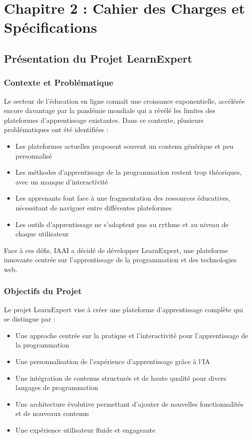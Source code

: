 \chapter*{Chapitre 2 : Cahier des Charges et Spécifications}
\thispagestyle{fancy}
\setcounter{section}{0}
\newpage

\section{Présentation du Projet LearnExpert}

\subsection{Contexte et Problématique}
Le secteur de l'éducation en ligne connaît une croissance exponentielle, accélérée encore davantage par la pandémie mondiale qui a révélé les limites des plateformes d'apprentissage existantes. Dans ce contexte, plusieurs problématiques ont été identifiées :

\begin{itemize}
  \item Les plateformes actuelles proposent souvent un contenu générique et peu personnalisé
  \item Les méthodes d'apprentissage de la programmation restent trop théoriques, avec un manque d'interactivité
  \item Les apprenants font face à une fragmentation des ressources éducatives, nécessitant de naviguer entre différentes plateformes
  \item Les outils d'apprentissage ne s'adaptent pas au rythme et au niveau de chaque utilisateur
\end{itemize}

Face à ces défis, IAAI a décidé de développer LearnExpert, une plateforme innovante centrée sur l'apprentissage de la programmation et des technologies web.

\subsection{Objectifs du Projet}
Le projet LearnExpert vise à créer une plateforme d'apprentissage complète qui se distingue par :

\begin{itemize}
  \item Une approche centrée sur la pratique et l'interactivité pour l'apprentissage de la programmation
  \item Une personnalisation de l'expérience d'apprentissage grâce à l'IA
  \item Une intégration de contenus structurés et de haute qualité pour divers langages de programmation
  \item Une architecture évolutive permettant d'ajouter de nouvelles fonctionnalités et de nouveaux contenus
  \item Une expérience utilisateur fluide et engageante
\end{itemize}

